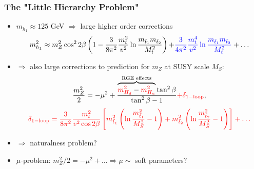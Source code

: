 \documentclass[10pt,aspectratio=169]{beamer}
\begin{document}
\begin{frame}
  \frametitle{The "Little Hierarchy Problem"}
  \begin{itemize}\itemsep1em
    \item $m_{h_1} \approx 125$ GeV $\Rightarrow$ large higher order
      corrections
      \begin{equation*}
        m_{h_1}^2 \approx m_Z^2 \cos^2 2\beta \left ( 1 - \frac{3}{8\pi^2}
          \frac{m_t^2}{v^2} \ln \frac{m_{\tilde{t}_1} m_{\tilde{t}_2}}{M_t^2}
          \right ) {+ \color{blue} \frac{3}{4\pi^2} \frac{m_t^4}{v^2} \ln
          \frac{m_{\tilde{t}_1} m_{\tilde{t}_2}}{M_t^2}} + \ldots
      \end{equation*}
    \item $\Rightarrow$ also large corrections to prediction for $m_Z$
      at SUSY scale $M_S$:
      \begin{equation*}
        \frac{m_Z^2}{2} = -\mu^2 + \frac{\overbrace{{\color{red} m_{H_d}^2} -
          {\color{red} m_{H_u}^2}}^{\text{RGE effects}} \tan^2\beta}
          {\tan^2\beta - 1} {\color{red} +  \delta_{1-\textrm{loop}}} ,
      \end{equation*}
      \begin{equation*}
          {\color{red}
          \delta_{1-\textrm{loop}} = \frac{3}{8\pi^2} \frac{m_t^2}{v^2
            \cos 2\beta} \left [ m_{\tilde{t}_1}^2 \left ( \ln
            \frac{m_{\tilde{t}_1}^2}{M_S^2} - 1 \right ) + m_{\tilde{t}_2}^2
            \left ( \ln \frac{m_{\tilde{t}_2}^2}{M_S^2} - 1 \right ) \right ]
            + \ldots }
      \end{equation*}
    \item $\Rightarrow$ naturalness problem?
    \item \alert{$\mu$-problem}: $m_Z^2/2 = -\mu^2 + \ldots \Rightarrow \mu
      \sim$ soft parameters?
  \end{itemize}
\end{frame}
\end{document}
